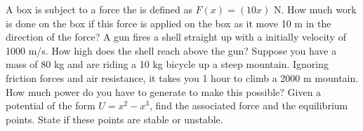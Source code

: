\documentclass[12pt]{article}
\begin{document}
\pagestyle{empty}
\noindent A box is subject to a force the is defined as $F(x) = (10 x)$ N. How much work is done on the box if this force is applied on the box as it move 10 m in the direction of the force? 
\newpage
\noindent A gun fires a shell straight up with a initially velocity of 1000 m/s.  How high does the shell reach above the gun?
\newpage
\noindent Suppose you have a mass of 80 kg and are riding a 10 kg bicycle up a steep mountain.  Ignoring friction forces and air resistance, it takes 
you 1 hour to climb a 2000 m mountain.  How much power do you have to generate to make this possible?
\newpage
\noindent Given a potential of the form $U = x^2 - x^3$, find the associated force and the equilibrium points.  State if these points are stable or unstable.
\end{document}
